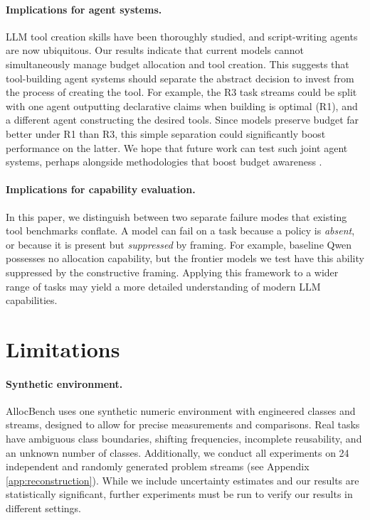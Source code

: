 \documentclass{article}
\begin{document}
\paragraph{Implications for agent systems.}
LLM tool creation skills have been thoroughly studied, and script-writing agents are now ubiquitous. Our results indicate that current models cannot simultaneously manage budget allocation and tool creation. This suggests that tool-building agent systems should separate the abstract decision to invest from the process of creating the tool. For example, the R3 task streams could be split with one agent outputting declarative claims when building is optimal (R1), and a different agent constructing the desired tools. Since models preserve budget far better under R1 than R3, this simple separation could significantly boost performance on the latter. We hope that future work can test such joint agent systems, perhaps alongside methodologies that boost budget awareness \citep{liu2025budgetaware, lin2026bagen, liu2026intent, li2026bavt, wang2026mcpp}.

\paragraph{Implications for capability evaluation.} In this paper, we distinguish between two separate failure modes that existing tool benchmarks
conflate. A model can fail on a task because a policy is \textit{absent}, or because it is present but \textit{suppressed} by framing. For example, baseline Qwen possesses no allocation capability, but the frontier models we test have this ability suppressed by the constructive framing. Applying this framework to a wider range of tasks may yield a more detailed understanding of modern LLM capabilities. 

\section{Limitations}

\paragraph{Synthetic environment.} AllocBench uses one synthetic numeric environment with engineered classes and streams, designed to allow for precise measurements and comparisons. Real tasks have ambiguous class boundaries, shifting frequencies, incomplete reusability, and an unknown number of classes. Additionally, we conduct all experiments on 24 independent and randomly generated problem streams (see Appendix \ref{app:reconstruction}). While we include uncertainty estimates and our results are statistically significant, further experiments must be run to verify our results in different settings.
\end{document}
